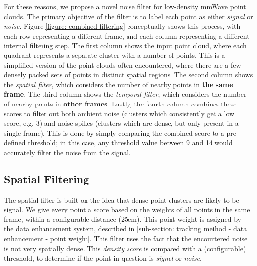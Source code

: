 For these reasons, we propose a novel noise filter for low-density mmWave point clouds.
The primary objective of the filter is to label each point as either \textit{signal} or \textit{noise}.
Figure \ref{figure: combined filtering} conceptually shows this process, with each row representing a different frame, and each column representing a different internal filtering step.
The first column shows the input point cloud, where each quadrant represents a separate cluster with a number of points.
This is a simplified version of the point clouds often encountered, where there are a few densely packed sets of points in distinct spatial regions.
The second column shows the \textit{spatial filter}, which considers the number of nearby points in \textbf{the same frame}.
The third column shows the \textit{temporal filter}, which considers the number of nearby points in \textbf{other frames}.
Lastly, the fourth column combines these scores to filter out both ambient noise (clusters which consistently get a low score, e.g. $3$) and noise spikes (clusters which are dense, but only present in a single frame).
This is done by simply comparing the combined score to a pre-defined threshold; in this case, any threshold value between 9 and 14 would accurately filter the noise from the signal.



\subsection{Spatial Filtering}
\label{sub-section: tracking method - data filtering - density filtering}

The spatial filter is built on the idea that dense point clusters are likely to be signal.
We give every point a score based on the weights of all points in the same frame, within a configurable distance (25cm).
This point weight is assigned by the data enhancement system, described in \cref{sub-section: tracking method - data enhancement - point weight}.
This filter uses the fact that the encountered noise is not very spatially dense.
This \textit{density score} is compared with a (configurable) threshold, to determine if the point in question is \textit{signal} or \textit{noise}.

